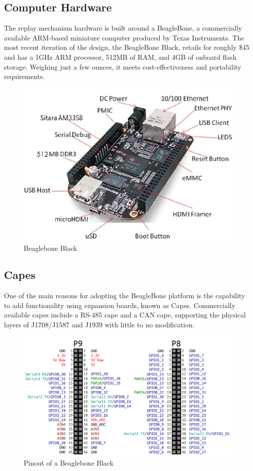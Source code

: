 \subsection{Computer Hardware}

The replay mechanism hardware is built around a BeagleBone, a commercially available ARM-based miniature computer produced
by Texas Instruments\cite{BeagleBone}. The most recent iteration of the design, the BeagleBone Black, retails for roughly \$45 and has a 1GHz ARM
processor, 512MB of RAM, and 4GB of onboard flash storage. Weighing just a few ounces, it meets cost-effectiveness and portability
requirements.

\begin{figure}[h]
  \centering
  \includegraphics{BeagleBoneBlack}
  \caption{Beaglebone Black}
  \label{fig:BBB}
\end{figure}

\subsection{Capes}

One of the main reasons for adopting the BeagleBone platform is the capability to add functionality using expansion boards, known
as Capes. Commercially available capes include a RS-485 cape and a CAN cape, supporting the physical layers of J1708/J1587 and J1939
with little to no modification.


\begin{figure}[h]
  \centering
  \includegraphics{BeaglebonePinout}
  \caption{Pinout of a Beaglebone Black}
  \label{fig:BBB-pinout}
\end{figure}

